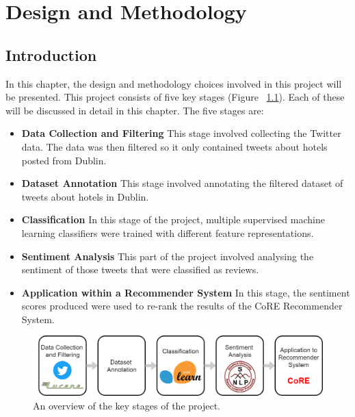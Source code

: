 \chapter{Design and Methodology}

\section{Introduction}

In this chapter, the design and methodology choices involved in this project will be presented. This project consists of five key stages (Figure ~\ref{fig:pipeline}). Each of these will be discussed in detail in this chapter. The five stages are:
\begin{itemize}
    \item \textbf{Data Collection and Filtering}\newline
    This stage involved collecting the Twitter data. The data was then filtered so it only contained tweets about hotels posted from Dublin.
    \item \textbf{Dataset Annotation}\newline
    This stage involved annotating the filtered dataset of tweets about hotels in Dublin.
    \item \textbf{Classification}\newline 
    In this stage of the project, multiple supervised machine learning classifiers were trained with different feature representations.
    \item \textbf{Sentiment Analysis}\newline 
    This part of the project involved analysing the sentiment of those tweets that were classified as reviews.
    \item \textbf{Application within a Recommender System}\newline
    In this stage, the sentiment scores produced were used to re-rank the results of the CoRE \cite{core2019} Recommender System.
\end{itemize}

\begin{figure}[h!]
\centering
\includegraphics[width=1\textwidth]{design_and_methodology/pipeline.png}
\caption{\label{fig:pipeline} An overview of the key stages of the project.}
\end{figure}

